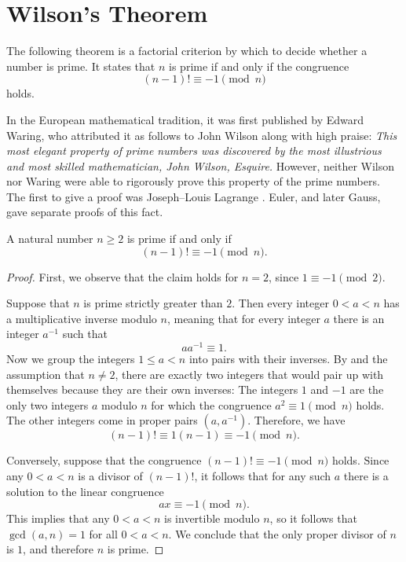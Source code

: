 \section{Wilson's Theorem}

The following theorem is a factorial criterion by which to decide whether a number is prime. It states that $n$ is prime if and only if the congruence
\begin{equation*}
  (n-1)!\equiv -1\pmod{n}
\end{equation*}
holds.

In the European mathematical tradition, it was first published by Edward Waring, who attributed it as follows to John Wilson \cite[p.~380]{waring1782} along with high praise: \textit{This most elegant property of prime numbers was discovered by the most illustrious and most skilled mathematician, John Wilson, Esquire.} However, neither Wilson nor Waring were able to rigorously prove this property of the prime numbers. The first to give a proof was Joseph--Louis Lagrange \cite{lagrange1771}. Euler, and later Gauss, gave separate proofs of this fact.

\begin{theorem}\label{theorem:wilsons-theorem}
  A natural number $n\geq 2$ is prime if and only if
  \begin{equation*}
    (n-1)!\equiv -1 \pmod{n}.
  \end{equation*}
\end{theorem}

\begin{proof}
  First, we observe that the claim holds for $n=2$, since $1\equiv -1\pmod{2}$.
  
  Suppose that $n$ is prime strictly greater than $2$. Then every integer $0<a<n$ has a multiplicative inverse modulo $n$, meaning that for every integer $a$ there is an integer $a^{-1}$ such that
  \begin{equation*}
    aa^{-1}\equiv 1.
  \end{equation*}
  Now we group the integers $1\leq a < n$ into pairs with their inverses. 
  By  and the assumption that $n\neq 2$, there are exactly two integers that would pair up with themselves because they are their own inverses: The integers $1$ and $-1$ are the only two integers $a$ modulo $n$ for which the congruence $a^2\equiv 1\pmod{n}$ holds. The other integers come in proper pairs $(a,a^{-1})$. Therefore, we have
  \begin{equation*}
    (n-1)!\equiv 1(n-1)\equiv -1\pmod{n}.
  \end{equation*}

  Conversely, suppose that the congruence $(n-1)!\equiv -1\pmod{n}$ holds. Since any $0<a<n$ is a divisor of $(n-1)!$, it follows that for any such $a$ there is a solution to the linear congruence
  \begin{equation*}
    ax\equiv -1\pmod{n}.
  \end{equation*}
  This implies that any $0<a<n$ is invertible modulo $n$, so it follows that $\gcd(a,n)=1$ for all $0<a<n$. We conclude that the only proper divisor of $n$ is $1$, and therefore $n$ is prime.
\end{proof}


